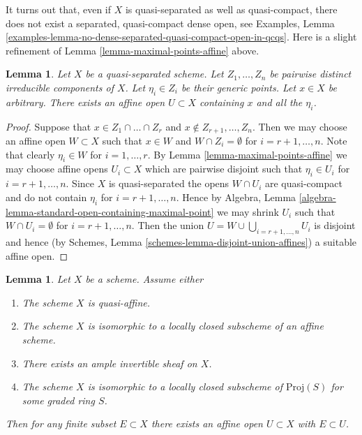 \documentclass{stacks-project}
\theoremstyle{plain}
\newtheorem{lemma}[subsection]{Lemma}
\theoremstyle{definition}
\theoremstyle{remark}
\numberwithin{equation}{subsection}
\begin{document}
\noindent
It turns out that, even if $X$ is quasi-separated as well as quasi-compact,
there does not exist a separated, quasi-compact dense open, see
Examples, Lemma
\ref{examples-lemma-no-dense-separated-quasi-compact-open-in-qcqs}.
Here is a slight refinement of Lemma \ref{lemma-maximal-points-affine} above.

\begin{lemma}
\label{lemma-point-and-maximal-points-affine}
Let $X$ be a quasi-separated scheme. Let $Z_1, \ldots, Z_n$ be pairwise
distinct irreducible components of $X$. Let $\eta_i \in Z_i$ be their
generic points. Let $x \in X$ be arbitrary.
There exists an affine open $U \subset X$ containing
$x$ and all the $\eta_i$.
\end{lemma}

\begin{proof}
Suppose that $x \in Z_1 \cap \ldots \cap Z_r$ and
$x \not \in Z_{r + 1}, \ldots, Z_n$. Then we may choose
an affine open $W \subset X$ such that
$x \in W$ and $W \cap Z_i = \emptyset$ for
$i = r + 1, \ldots, n$. Note that clearly $\eta_i \in W$
for $i = 1, \ldots, r$. By Lemma \ref{lemma-maximal-points-affine}
we may choose affine opens $U_i \subset X$ which are pairwise
disjoint such that $\eta_i \in U_i$ for $i = r + 1, \ldots, n$.
Since $X$ is quasi-separated the opens $W \cap U_i$
are quasi-compact and do not contain $\eta_i$ for
$i = r + 1, \ldots, n$. Hence by
Algebra, Lemma \ref{algebra-lemma-standard-open-containing-maximal-point}
we may shrink $U_i$ such that $W \cap U_i = \emptyset$
for $i = r + 1, \ldots, n$. Then the union
$U = W \cup \bigcup_{i = r + 1, \ldots, n} U_i$ is disjoint and hence
(by Schemes, Lemma \ref{schemes-lemma-disjoint-union-affines})
a suitable affine open.
\end{proof}

\begin{lemma}
\label{lemma-ample-finite-set-in-affine}
Let $X$ be a scheme. Assume either
\begin{enumerate}
\item The scheme $X$ is quasi-affine.
\item The scheme $X$ is isomorphic to a locally closed subscheme
of an affine scheme.
\item There exists an ample invertible sheaf on $X$.
\item The scheme $X$ is isomorphic to a locally closed subscheme
of $\text{Proj}(S)$ for some graded ring $S$.
\end{enumerate}
Then for any finite subset $E \subset X$ there exists an
affine open $U \subset X$ with $E \subset U$.
\end{lemma}
\end{document}
